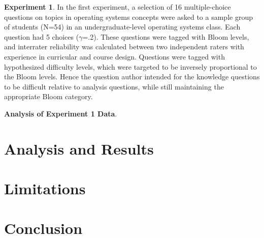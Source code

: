 \documentclass[a4paper,twocolumn]{article}
\begin{document}
\textbf{Experiment 1}. In the first experiment, a selection of 16
multiple-choice questions on topics in operating systems concepts were asked to
a sample group of students (N=54) in an undergraduate-level operating systems
class.  Each question had 5 choices ($\gamma$=.2). These questions were tagged
with Bloom levels, and interrater reliability was calculated between two
independent raters with experience in curricular and course design.  Questions
were tagged with hypothesized difficulty levels, which were targeted to be
inversely proportional to the Bloom levels.  Hence the question author intended
for the knowledge questions to be difficult relative to analysis questions,
while still maintaining the appropriate Bloom category.

\textbf{Analysis of Experiment 1 Data}.


\section{Analysis and Results}


\section{Limitations}


\section{Conclusion}




\end{document}
